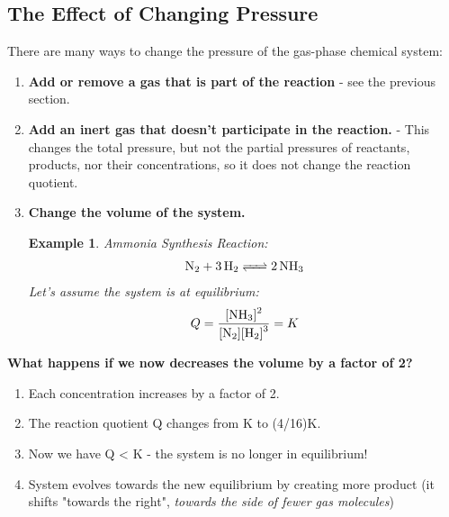 \documentclass{article}  %
\newtheorem{exmp}{Example}
\begin{document}
\subsection*{The Effect of Changing Pressure}
There are many ways to change the pressure of the gas-phase chemical system:
\begin{enumerate}
    \item \textbf{Add or remove a gas that is part of the reaction} - see the previous section.
    \item \textbf{Add an inert gas that doesn't participate in the reaction.} - This changes the total pressure, but not the partial pressures of reactants, products, nor their concentrations, so it does not change the reaction quotient.
    \item \textbf{Change the volume of the system.} 
        \begin{exmp}
            Ammonia Synthesis Reaction:
                \begin{equation*}
                    \begin{aligned}
                        \ce{N2 + 3H2 <=> 2 NH3}
                    \end{aligned}
                \end{equation*}
            Let's assume the system is at equilibrium: 
                \begin{equation*}
                    \begin{aligned}
                        Q = \ce{\frac{[NH3]^2}{[N2][H2]^3}} = K
                    \end{aligned}
                \end{equation*}
        \end{exmp}
\end{enumerate}
\textbf{What happens if we now decreases the volume by a factor of 2?}
\begin{enumerate}
    \item Each concentration increases by a factor of 2. 
    \item The reaction quotient Q changes from K to (4/16)K.
    \item Now we have Q < K - the system is no longer in equilibrium!
    \item System evolves towards the new equilibrium by creating more product (it shifts "towards the right", \emph{towards the side of fewer gas molecules})
\end{enumerate}
\end{document}
